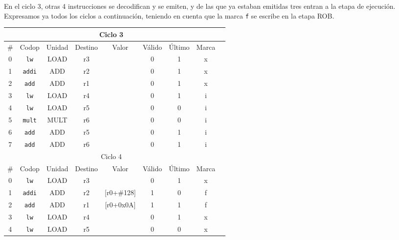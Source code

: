 \begin{ejercicio}
    En el ciclo $3$, otras 4 instrucciones se decodifican y se emiten, y de las que ya estaban emitidas tres entran a la etapa de ejecución. Expresamos ya
    todos los ciclos a continuación, teniendo en cuenta que la marca \verb|f| se escribe en la etapa ROB.
    \begin{center}
        \scriptsize
        \begin{tabular}{|c|c|c|c|c|c|c|c|c|}
            \hline
            \multicolumn{8}{|c|}{Ciclo 3} \\
            \hline
            \# & Codop      & Unidad & Destino & Valor & Válido & Último & Marca \\ \hline
            0  & \verb|lw|  & LOAD   & r3      &       & 0      & 1      & x     \\ \hline
            1  & \verb|addi|& ADD    & r2      &       & 0      & 1      & x     \\ \hline
            2  & \verb|add| & ADD    & r1      &       & 0      & 1      & x     \\ \hline
            3  & \verb|lw|  & LOAD   & r4      &       & 0      & 1      & i     \\ \hline
            4  & \verb|lw|  & LOAD   & r5      &       & 0      & 0      & i     \\ \hline
            5  & \verb|mult|& MULT   & r6      &       & 0      & 0      & i     \\ \hline
            6  & \verb|add| & ADD    & r5      &       & 0      & 1      & i     \\ \hline
            7  & \verb|add| & ADD    & r6      &       & 0      & 1      & i     \\ \hline
            \hline
            \multicolumn{8}{|c|}{Ciclo 4} \\
            \hline
            \# & Codop      & Unidad & Destino & Valor & Válido & Último & Marca \\ \hline
            0  & \verb|lw|  & LOAD   & r3      &       & 0      & 1      & x     \\ \hline
            1  & \verb|addi|& ADD    & r2      & [r0+\#128] & 1 & 0      & f     \\ \hline
            2  & \verb|add| & ADD    & r1      & [r0+0x0A]  & 1 & 1      & f     \\ \hline
            3  & \verb|lw|  & LOAD   & r4      &       & 0      & 1      & x     \\ \hline
            4  & \verb|lw|  & LOAD   & r5      &       & 0      & 0      & x     \\ \hline

\end{tabular}
\end{center}
\end{ejercicio}

